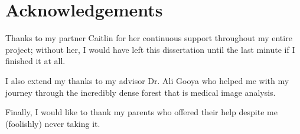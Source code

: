 \documentclass{l4proj}
\begin{document}
\chapter*{Acknowledgements} \label{chap:acknowledgments}

Thanks to my partner Caitlin for her continuous support throughout my entire project; without her, I would have left this dissertation until the last minute if I finished it at all.

I also extend my thanks to my advisor Dr. Ali Gooya who helped me with my journey through the incredibly dense forest that is medical image analysis.

Finally, I would like to thank my parents who offered their help despite me (foolishly) never taking it.




\def\consentname {Jim Carty} %
\def\consentdate {29th March 2023} %

\educationalconsent


\tableofcontents

%
%
%
\end{document}
